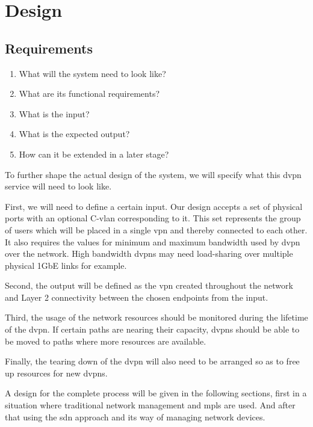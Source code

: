 \section{Design} %
\label{sec:design}

\subsection{Requirements} %
\label{sub:requirements}
\begin{enumerate}
	\item What will the system need to look like?
	\item What are its functional requirements?
	\item What is the input?
	\item What is the expected output?
	\item How can it be extended in a later stage?
\end{enumerate}

To further shape the actual design of the system, we will specify what this \ac{dvpn} service will need to look like. 

First, we will need to define a certain input. Our design accepts a set of physical ports with an optional C-\ac{vlan} corresponding to it. This set represents the group of users which will be placed in a single \ac{vpn} and thereby connected to each other. It also requires the values for minimum and maximum bandwidth used by \ac{dvpn} over the network. High bandwidth \acp{dvpn} may need load-sharing over multiple physical 1GbE links for example.

Second, the output will be defined as the \ac{vpn} created throughout the network and Layer 2 connectivity between the chosen endpoints from the input.

Third, the usage of the network resources should be monitored during the lifetime of the \ac{dvpn}. If certain paths are nearing their capacity, \acp{dvpn} should be able to be moved to paths where more resources are available.

Finally, the tearing down of the \ac{dvpn} will also need to be arranged so as to free up resources for new \acp{dvpn}.

A design for the complete process will be given in the following sections, first in a situation where traditional network management and \ac{mpls} are used. And after that using the \ac{sdn} approach and its way of managing network devices.

